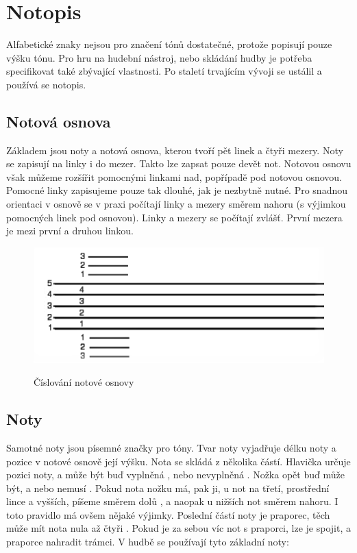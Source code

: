 \section{Notopis}
Alfabetické znaky nejsou pro značení tónů dostatečné, protože popisují pouze výšku tónu.
Pro hru na hudební nástroj, nebo skládání hudby je potřeba specifikovat také zbývající vlastnosti.
Po staletí trvajícím vývoji se ustálil a používá se notopis.\par

\subsection{Notová osnova}
Základem jsou noty a notová osnova, kterou tvoří pět linek a čtyři mezery.
Noty se zapisují na linky i do mezer.
Takto lze zapsat pouze devět not.
Notovou osnovu však můžeme rozšířit pomocnými linkami nad, popřípadě pod notovou osnovou. 
Pomocné linky zapisujeme pouze tak dlouhé, jak je nezbytně nutné.
Pro snadnou orientaci v osnově se v praxi počítají linky a mezery směrem nahoru (s výjimkou pomocných linek pod osnovou). 
Linky a mezery se počítají zvlášť. 
První mezera je mezi první a druhou linkou.\par

\begin{figure}[h]\centering
    \centering
    \includegraphics[width=0.5\linewidth]{obrazky/notovaOsnova.png}\\[1pt]  
    \caption{Číslování notové osnovy}    
    \label{obrazekNotovaOsnova}
\end{figure}

\subsection{Noty}
Samotné noty jsou písemné značky pro tóny.
Tvar noty vyjadřuje délku noty a pozice v notové osnově její výšku.
Nota se skládá z několika částí.
Hlavička určuje pozici noty, a může být buď vyplněná , nebo nevyplněná . 
Nožka opět buď může být, a nebo nemusí . 
Pokud nota nožku má, pak ji, u not na třetí, prostřední lince a vyšších, píšeme směrem dolů ,
a naopak u nižších not směrem nahoru.
I toto pravidlo má ovšem nějaké výjimky.
Poslední částí noty je praporec, těch může mít nota nula až čtyři .
Pokud je za sebou víc not s praporci, lze je spojit, a praporce nahradit trámci.
V hudbě se používají tyto základní noty:


